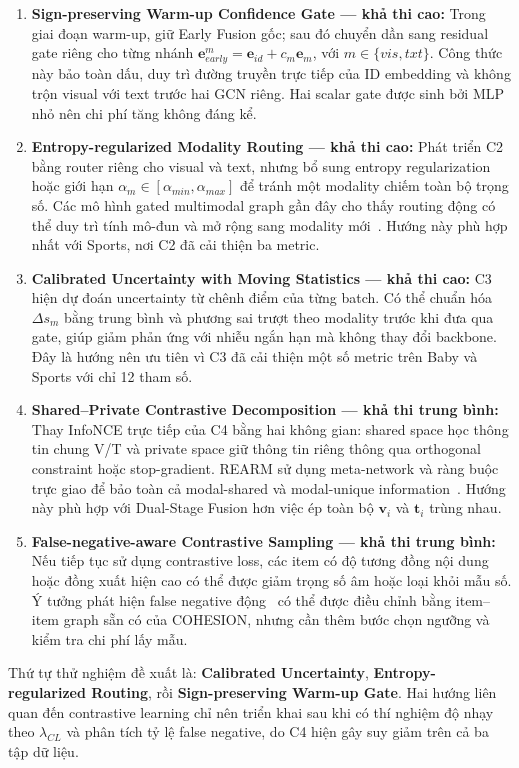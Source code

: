 \begin{enumerate}[leftmargin=*,label=\textbf{Hướng \arabic*.}]
    \item \textbf{Sign-preserving Warm-up Confidence Gate --- khả thi cao:}
    Trong giai đoạn warm-up, giữ Early Fusion gốc; sau đó chuyển dần sang residual gate riêng cho từng nhánh
    $\mathbf e_{early}^{m}=\mathbf e_{id}+c_m\mathbf e_m$, với $m\in\{vis,txt\}$.
    Công thức này bảo toàn dấu, duy trì đường truyền trực tiếp của ID embedding và không trộn visual với text trước hai GCN riêng. Hai scalar gate được sinh bởi MLP nhỏ nên chi phí tăng không đáng kể.

    \item \textbf{Entropy-regularized Modality Routing --- khả thi cao:}
    Phát triển C2 bằng router riêng cho visual và text, nhưng bổ sung entropy regularization hoặc giới hạn $\alpha_m\in[\alpha_{min},\alpha_{max}]$ để tránh một modality chiếm toàn bộ trọng số. Các mô hình gated multimodal graph gần đây cho thấy routing động có thể duy trì tính mô-đun và mở rộng sang modality mới~\cite{liu2025gated}. Hướng này phù hợp nhất với Sports, nơi C2 đã cải thiện ba metric.

    \item \textbf{Calibrated Uncertainty with Moving Statistics --- khả thi cao:}
    C3 hiện dự đoán uncertainty từ chênh điểm của từng batch. Có thể chuẩn hóa $\Delta s_m$ bằng trung bình và phương sai trượt theo modality trước khi đưa qua gate, giúp giảm phản ứng với nhiễu ngắn hạn mà không thay đổi backbone. Đây là hướng nên ưu tiên vì C3 đã cải thiện một số metric trên Baby và Sports với chỉ 12 tham số.

    \item \textbf{Shared--Private Contrastive Decomposition --- khả thi trung bình:}
    Thay InfoNCE trực tiếp của C4 bằng hai không gian: shared space học thông tin chung V/T và private space giữ thông tin riêng thông qua orthogonal constraint hoặc stop-gradient. REARM sử dụng meta-network và ràng buộc trực giao để bảo toàn cả modal-shared và modal-unique information~\cite{ma2025rearm}. Hướng này phù hợp với Dual-Stage Fusion hơn việc ép toàn bộ $\mathbf v_i$ và $\mathbf t_i$ trùng nhau.

    \item \textbf{False-negative-aware Contrastive Sampling --- khả thi trung bình:}
    Nếu tiếp tục sử dụng contrastive loss, các item có độ tương đồng nội dung hoặc đồng xuất hiện cao có thể được giảm trọng số âm hoặc loại khỏi mẫu số. Ý tưởng phát hiện false negative động~\cite{balmaseda2025glofnd} có thể được điều chỉnh bằng item--item graph sẵn có của COHESION, nhưng cần thêm bước chọn ngưỡng và kiểm tra chi phí lấy mẫu.
\end{enumerate}

Thứ tự thử nghiệm đề xuất là: \textbf{Calibrated Uncertainty}, \textbf{Entropy-regularized Routing}, rồi \textbf{Sign-preserving Warm-up Gate}. Hai hướng liên quan đến contrastive learning chỉ nên triển khai sau khi có thí nghiệm độ nhạy theo $\lambda_{CL}$ và phân tích tỷ lệ false negative, do C4 hiện gây suy giảm trên cả ba tập dữ liệu.

\clearpage